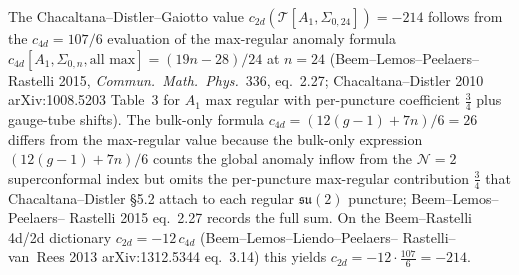 \begin{remark}[\texorpdfstring{$c_{2d}=-214$}{c-2d=-214} and its four factorisations]
\label{rem:cydkappa-c2d-214-restoration}
The Chacaltana--Distler--Gaiotto value
$c_{2d}(\mathcal T[A_1,\Sigma_{0,24}]) = -214$ follows from the
$c_{4d}=107/6$ evaluation of the max-regular anomaly formula
$c_{4d}[A_1,\Sigma_{0,n},\text{all max}] = (19n-28)/24$ at $n=24$
(Beem--Lemos--Peelaers--Rastelli 2015, \emph{Commun.~Math.~Phys.}~336,
eq.~2.27; Chacaltana--Distler 2010 arXiv:1008.5203 Table~3 for $A_1$
max regular with per-puncture coefficient $\tfrac{3}{4}$
plus gauge-tube shifts). The bulk-only formula
$c_{4d} = (12(g-1)+7n)/6 = 26$ differs from the max-regular value
because the bulk-only expression
$(12(g-1)+7n)/6$ counts the global anomaly inflow from the $\mathcal N=2$
superconformal index but omits the per-puncture max-regular
contribution $\tfrac{3}{4}$ that Chacaltana--Distler \S5.2 attach to
each regular $\mathfrak{su}(2)$ puncture; Beem--Lemos--Peelaers--
Rastelli 2015 eq.~2.27 records the full sum. On the Beem--Rastelli
4d/2d dictionary $c_{2d}=-12\,c_{4d}$ (Beem--Lemos--Liendo--Peelaers--
Rastelli--van~Rees 2013 arXiv:1312.5344 eq.~3.14) this yields
$c_{2d} = -12\cdot\tfrac{107}{6} = -214$.


\end{remark}
